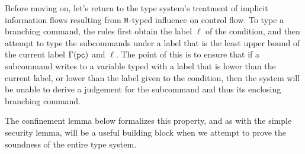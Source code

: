 \documentclass[11pt,twoside]{scrartcl}
\begin{document}
Before moving on, let's return to the type system's treatment of implicit information flows resulting from $\texttt{\upshape H}$-typed influence on control flow. To type a branching command, the rules first obtain the label $\ell$ of the condition, and then attempt to type the subcommands under a \pc label that is the least upper bound of the current \pc label $\Gamma(\texttt{\upshape pc})$ and $\ell$. The point of this is to ensure that if a subcommand writes to a variable typed with a label that is lower than the current \pc label, or lower than the label given to the condition, then the system will be unable to derive a judgement for the subcommand and thus its enclosing branching command.

The confinement lemma below formalizes this property, and as with the simple security lemma, will be a useful building block when we attempt to prove the soundness of the entire type system.
\end{document}
